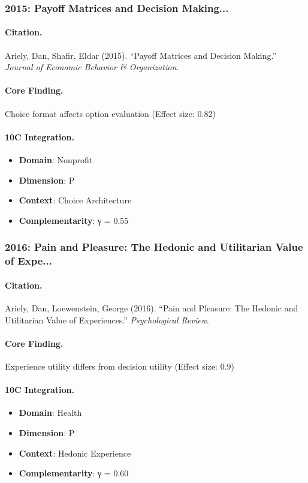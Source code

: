 \subsubsection{2015: Payoff Matrices and Decision Making...}

\paragraph{Citation.}
Ariely, Dan, Shafir, Eldar (2015). ``Payoff Matrices and Decision Making.''
\textit{Journal of Economic Behavior & Organization}.

\paragraph{Core Finding.}
Choice format affects option evaluation (Effect size: 0.82)

\paragraph{10C Integration.}
\begin{itemize}[nosep]
  \item \textbf{Domain}: Nonprofit
  \item \textbf{Dimension}: P
  \item \textbf{Context}: Choice Architecture
  \item \textbf{Complementarity}: γ = 0.55
\end{itemize}

\subsubsection{2016: Pain and Pleasure: The Hedonic and Utilitarian Value of Expe...}

\paragraph{Citation.}
Ariely, Dan, Loewenstein, George (2016). ``Pain and Pleasure: The Hedonic and Utilitarian Value of Experiences.''
\textit{Psychological Review}.

\paragraph{Core Finding.}
Experience utility differs from decision utility (Effect size: 0.9)

\paragraph{10C Integration.}
\begin{itemize}[nosep]
  \item \textbf{Domain}: Health
  \item \textbf{Dimension}: P
  \item \textbf{Context}: Hedonic Experience
  \item \textbf{Complementarity}: γ = 0.60
\end{itemize}

